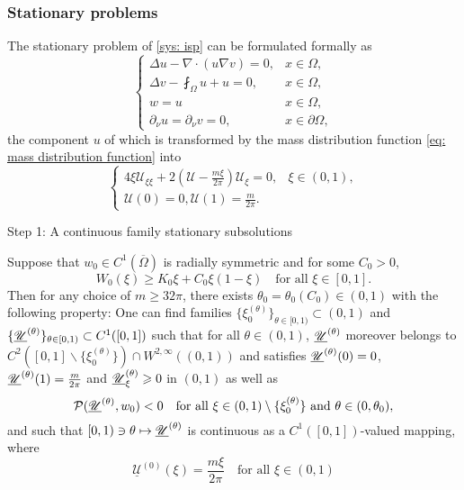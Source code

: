 \begin{frame}
\frametitle{Stationary problems}
The stationary problem of \eqref{sys: isp} can be formulated formally as
\begin{equation}\nonumber
  \begin{cases}
    \Delta u - \nabla\cdot(u\nabla v) = 0, & x\in\Omega, \\
    \Delta v - \fint_\Omega u + u = 0, & x\in\Omega, \\
    w = u & x\in\Omega, \\
    \partial_\nu u = \partial_\nu v = 0, & x\in\partial\Omega,
  \end{cases}
\end{equation}
the component $u$ of which is transformed by the mass distribution function \eqref{eq: mass distribution function} into
\begin{equation}\label{sys: stationary problem of mass distribution pde}
  \begin{cases}
    4\xi \mathscr U_{\xi\xi} + 2\left( \mathscr U-\frac{m\xi}{2\pi}\right)\mathscr U_\xi = 0, & \xi\in(0,1),\\
    \mathscr U(0)=0, \mathscr U(1)=\frac{m}{2\pi}.
  \end{cases}
\end{equation}
\end{frame}



\begin{frame}{Step 1: A continuous family stationary subsolutions}
\begin{lemma}\label{le: stationary subsolution}
	Suppose that $w_0\in C^1(\overline{\Omega})$ is radially symmetric and for some $C_0 > 0$,
	\begin{equation}\label{h: W_0 behaves well}
		W_0(\xi) \geqslant K_0\xi + C_0\xi(1-\xi)\quad\text{for all } \xi\in[0,1].
	\end{equation}
	Then for any choice of $m \geqslant32\pi$, there exists $\theta_0=\theta_0(C_0)\in(0,1)$ with the following property:  One can find families $\{\xi_0^{(\theta)}\}_{\theta\in[0, 1)}\subset(0, 1)$ and $\{\underline{\mathscr U}^{(\theta)}\}_{\theta\in[0, 1)}\subset C^1([0, 1])$ such that for all $\theta\in(0, 1)$, $\underline{\mathscr U}^{(\theta)}$ moreover belongs to $C^2([0, 1]\backslash \{\xi_0^{(\theta)}\})\cap W^{2, \infty}((0, 1))$ and satisfies $\underline{\mathscr U}^{(\theta)}(0) = 0$, $\underline{\mathscr U}^{(\theta)}(1) = \frac{m}{2\pi}$ and $\underline{\mathscr U}^{(\theta)}_\xi\geqslant 0$ in $(0, 1)$ as well as
	\begin{equation}\label{eq: subsolution equation}
		\mathcal{P}(\underline{\mathscr U}^{(\theta)}, w_0) < 0 \quad\text{for all } \xi\in(0, 1)\setminus \{ \xi_0^{(\theta)}\} \text{ and } \theta\in(0, \theta_0),
	\end{equation}
	and such that $[0, 1) \ni \theta \mapsto \underline{\mathscr U}^{(\theta)} $ is continuous as a $C^1([0, 1])$-valued mapping, where
	\begin{equation}\label{eq:uu0}
		\underline{\mathscr U}^{(0)}(\xi) = \frac{m\xi}{2\pi} \quad\text{for all } \xi\in(0, 1)
	\end{equation}

\end{lemma}

\end{frame}


